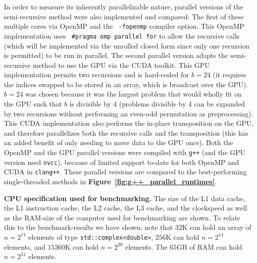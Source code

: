 \documentclass[10pt]{article}
\begin{document}
In order to measure its inherently parallelizable nature, parallel
versions of the semi-recursive method were also implemented and
compared: The first of these multiple cores via OpenMP and the {\tt
  -fopenmp} compiler option. This OpenMP implementation uses {\tt
  \#pragma omp parallel for} to allow the recursive calls (which will
be implemented via the unrolled closed form since only one recursion
is permitted) to be run in parallel. The second parallel version
adapts the semi-recursive method to use the GPU via the CUDA
toolkit. This GPU implementation permits two recursions and is
hard-coded for $b=24$ (it requires the indices swapped to be stored in
an array, which is broadcast over the GPU). $b=24$ was chosen because
it was the largest problem that would wholly fit on the GPU such that
$b$ is divisible by 4 (problems divisible by 4 can be expanded by two
recursions without performing an even-odd permutation as
preprocessing). This CUDA implementation also performs the in-place
transposition on the GPU\cite{harris:cuda}, and therefore parallelizes
both the recursive calls and the transposition (this has an added
benefit of only needing to move data to the GPU once). Both the OpenMP
and the GPU parallel versions were compiled with {\tt g++} (and the
GPU version used {\tt nvcc}), because of limited support to-date for
both OpenMP and CUDA in {\tt clang++}. These parallel versions are
compared to the best-performing single-threaded methods in {\bf
  Figure~\ref{fig:g++_parallel_runtimes}}.

\begin{table}[ht!]
  \centering
  
\caption{ {\bf CPU specification used for benchmarking.} The size of
  the L1 data cache, the L1 instruction cache, the L2 cache, the L3
  cache, and the clockspeed as well as the RAM-size of the computer
  used for benchmarking are shown. To relate this to the
  benchmark-results we have shown, note that $32$K can hold an
  array of $n=2^{11}$ elements of type {\tt std::complex<double>},
  $256$K can hold $n=2^{14}$ elements, and $15360$K can hold $n=2^{20}$
  elements. The $65$GB of RAM can hold $n=2^{31}$ elements. 
  \label{table:cpu_spec}
}
\end{table}
\end{document}
